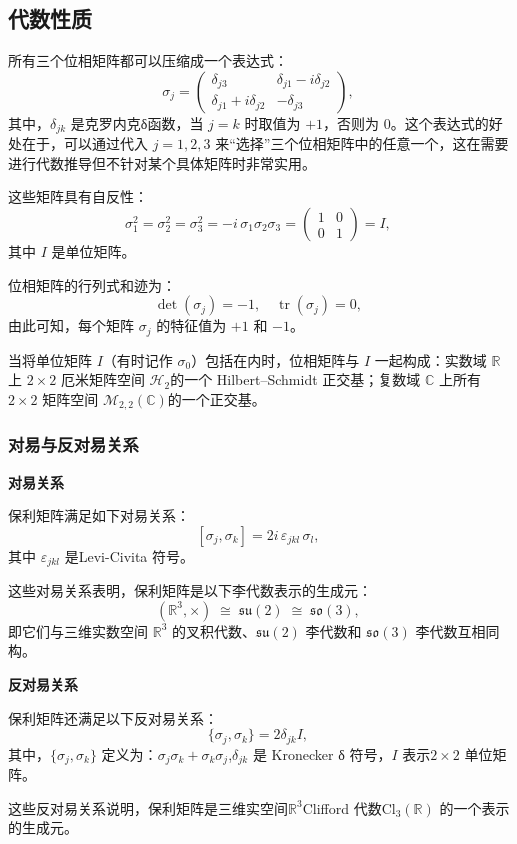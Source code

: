 \subsection{代数性质}
所有三个位相矩阵都可以压缩成一个表达式：
$$
\sigma_j =
\begin{pmatrix}
\delta_{j3} & \delta_{j1} - i\delta_{j2} \\
\delta_{j1} + i\delta_{j2} & -\delta_{j3}
\end{pmatrix},~
$$
其中，$\delta_{jk}$ 是克罗内克δ函数，当 $j = k$ 时取值为 $+1$，否则为 $0$。这个表达式的好处在于，可以通过代入 $j = 1, 2, 3$ 来“选择”三个位相矩阵中的任意一个，这在需要进行代数推导但不针对某个具体矩阵时非常实用。

这些矩阵具有自反性：
$$
\sigma_1^2 = \sigma_2^2 = \sigma_3^2 = -i\,\sigma_1\sigma_2\sigma_3 =
\begin{pmatrix}
1 & 0 \\
0 & 1
\end{pmatrix}
= I,~
$$
其中 $I$ 是单位矩阵。

位相矩阵的行列式和迹为：
$$
\det(\sigma_j) = -1, \quad
\operatorname{tr}(\sigma_j) = 0,~
$$
由此可知，每个矩阵 $\sigma_j$ 的特征值为 $+1$ 和 $-1$。

当将单位矩阵 $I$（有时记作 $\sigma_0$）包括在内时，位相矩阵与 $I$ 一起构成：实数域 $\mathbb{R}$ 上 $2 \times 2$ 厄米矩阵空间 $\mathcal{H}_2$的一个 Hilbert–Schmidt 正交基；复数域 $\mathbb{C}$ 上所有 $2 \times 2$ 矩阵空间 $\mathcal{M}_{2,2}(\mathbb{C})$的一个正交基。
\subsubsection{对易与反对易关系}
\textbf{对易关系}

保利矩阵满足如下对易关系：
$$
[\sigma_j, \sigma_k] = 2i \, \varepsilon_{jkl} \, \sigma_l,~
$$
其中 $\varepsilon_{jkl}$ 是Levi-Civita 符号。


这些对易关系表明，保利矩阵是以下李代数表示的生成元：
$$
(\mathbb{R}^3, \times) \;\cong\; \mathfrak{su}(2) \;\cong\; \mathfrak{so}(3),~
$$
即它们与三维实数空间 $\mathbb{R}^3$ 的叉积代数、$\mathfrak{su}(2)$ 李代数和 $\mathfrak{so}(3)$ 李代数互相同构。

\textbf{反对易关系}

保利矩阵还满足以下反对易关系：
$$
\{\sigma_j, \sigma_k\} = 2 \delta_{jk} I,~
$$
其中，$\{\sigma_j, \sigma_k\}$ 定义为：$\sigma_j \sigma_k + \sigma_k \sigma_j$,$\delta_{jk}$ 是 Kronecker δ 符号，$I$ 表示$2 \times 2$ 单位矩阵。


这些反对易关系说明，保利矩阵是三维实空间$\mathbb{R}^3$Clifford 代数$\mathrm{Cl}_3(\mathbb{R})$ 的一个表示的生成元。

